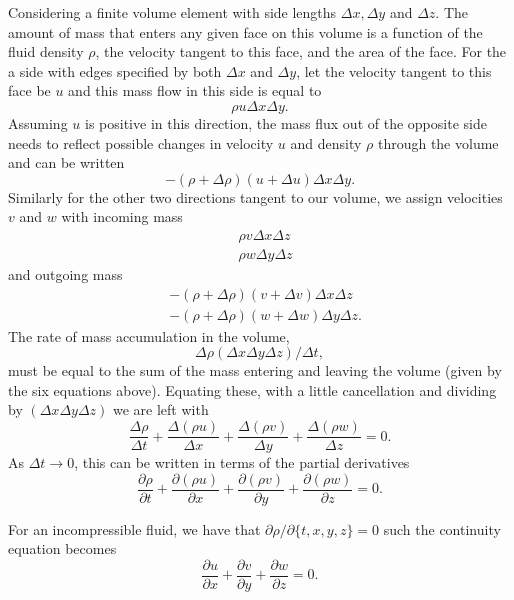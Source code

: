 Considering a finite volume element with side lengths $\Delta x, \Delta y$ and $\Delta z$.
The amount of mass that enters any given face on this volume is a function of the fluid density $\rho$, the velocity tangent to this face, and the area of the face.
For the a side with edges specified by both $\Delta x$ and $\Delta y$, let the velocity tangent to this face be $u$ and this mass flow in this side is equal to
$$ \rho u \Delta x \Delta y .$$
Assuming $u$ is positive in this direction, the mass flux out of the opposite side needs to reflect possible changes in velocity $u$ and density $\rho$ through the volume and can be written
$$ -(\rho + \Delta \rho) (u+\Delta u) \Delta x \Delta y.$$
Similarly for the other two directions tangent to our volume, we assign velocities $v$ and $w$ with incoming mass
\begin{align*} &\rho v \Delta x \Delta z\\
&\rho w \Delta y \Delta z\end{align*}
and outgoing mass
\begin{align*} &-(\rho + \Delta \rho )( v+ \Delta v) \Delta x \Delta z\\
&-(\rho+\Delta \rho) (w+\Delta w) \Delta y \Delta z.\end{align*}
The rate of mass accumulation in the volume,
$$ \Delta \rho (\Delta x \Delta y \Delta z) / \Delta t, $$
must be equal to the sum of the mass entering and leaving the volume (given by the six equations above).
Equating these, with a little cancellation and dividing by $(\Delta x \Delta y \Delta z)$ we are left with
\begin{equation} \frac{\Delta \rho}{\Delta t} + \frac{\Delta (\rho u)}{\Delta x} + \frac{\Delta (\rho v)}{\Delta y} + \frac{\Delta (\rho w)}{\Delta z} = 0. \end{equation}
As $\Delta t \to 0$, this can be written in terms of the partial derivatives
\begin{equation} \frac{\partial \rho}{\partial t} + \frac{\partial (\rho u)}{\partial x} + \frac{\partial (\rho v)}{\partial y} + \frac{\partial (\rho w)}{\partial z} = 0. \label{eq:NScont} \end{equation}

For an incompressible fluid, we have that $\partial \rho / \partial \{ t,x,y,z\} = 0$ such the continuity equation becomes
\begin{equation} \frac{\partial u}{\partial x} + \frac{\partial v}{\partial y} + \frac{\partial w}{\partial z} = 0. \label{eq:NScontIco} \end{equation}

